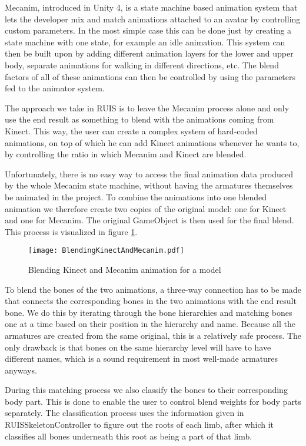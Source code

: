 \documentclass[12pt,a4paper,oneside,pdftex]{report}
\begin{document}
Mecanim, introduced in Unity 4, is a state machine based animation system that lets the developer mix and match animations attached to an avatar by controlling custom parameters. In the most simple case this can be done just by creating a state machine with one state, for example an idle animation. This system can then be built upon by adding different animation layers for the lower and upper body, separate animations for walking in different directions, etc. The blend factors of all of these animations can then be controlled by using the parameters fed to the animator system. 

The approach we take in RUIS is to leave the Mecanim process alone and only use the end result as something to blend with the animations coming from Kinect. This way, the user can create a complex system of hard-coded animations, on top of which he can add Kinect animations whenever he wants to, by controlling the ratio in which Mecanim and Kinect are blended.

Unfortunately, there is no easy way to access the final animation data produced by the whole Mecanim state machine, without having the armatures themselves be animated in the project. To combine the animations into one blended animation we therefore create two copies of the original model: one for Kinect and one for Mecanim. The original GameObject is then used for the final blend. This process is visualized in figure \ref{fig:blendingkinectandmecanim}.

\begin{figure}[h]
\centering
\texttt{[image: BlendingKinectAndMecanim.pdf]}
\caption{Blending Kinect and Mecanim animation for a model}
\label{fig:blendingkinectandmecanim}
\end{figure}

To blend the bones of the two animations, a three-way connection has to be made that connects the corresponding bones in the two animations with the end result bone. We do this by iterating through the bone hierarchies and matching bones one at a time based on their position in the hierarchy and name. Because all the armatures are created from the same original, this is a relatively safe process. The only drawback is that bones on the same hierarchy level will have to have different names, which is a sound requirement in most well-made armatures anyways. 

During this matching process we also classify the bones to their corresponding body part. This is done to enable the user to control blend weights for body parts separately. The classification process uses the information given in RUISSkeletonController to figure out the roots of each limb, after which it classifies all bones underneath this root as being a part of that limb. 
\end{document}
